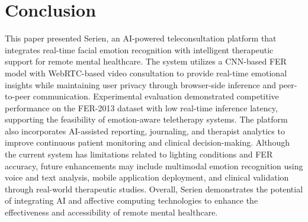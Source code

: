 \documentclass[conference]{IEEEtran}
\begin{document}
\section{Conclusion}
This paper presented Serien, an AI-powered teleconsultation platform that integrates real-time facial emotion recognition with intelligent therapeutic support for remote mental healthcare. The system utilizes a CNN-based FER model with WebRTC-based video consultation to provide real-time emotional insights while maintaining user privacy through browser-side inference and peer-to-peer communication.
Experimental evaluation demonstrated competitive performance on the FER-2013 dataset with low real-time inference latency, supporting the feasibility of emotion-aware teletherapy systems. The platform also incorporates AI-assisted reporting, journaling, and therapist analytics to improve continuous patient monitoring and clinical decision-making.
Although the current system has limitations related to lighting conditions and FER accuracy, future enhancements may include multimodal emotion recognition using voice and text analysis, mobile application deployment, and clinical validation through real-world therapeutic studies. Overall, Serien demonstrates the potential of integrating AI and affective computing technologies to enhance the effectiveness and accessibility of remote mental healthcare.
\end{document}
